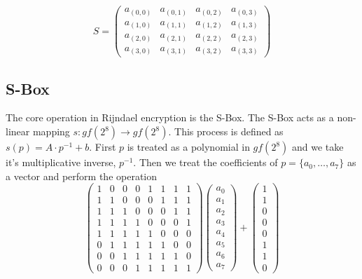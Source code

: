 \documentclass{article}
\begin{document}
\[ S = \left( \begin{array}{cccc}
a_{(0,0)} & a_{(0,1)} & a_{(0,2)} & a_{(0,3)} \\
a_{(1,0)} & a_{(1,1)} & a_{(1,2)} & a_{(1,3)} \\
a_{(2,0)} & a_{(2,1)} & a_{(2,2)} & a_{(2,3)} \\
a_{(3,0)} & a_{(3,1)} & a_{(3,2)} & a_{(3,3)} \end{array} \right)\]

\subsection{S-Box}

The core operation in Rijndael encryption is the S-Box.  The S-Box acts as a non-linear mapping $s:gf(2^8)\rightarrow gf(2^8)$. This process is defined as $s(p) = A \cdot p^{-1} + b$.  First $p$ is treated as a polynomial in $gf(2^8)$ and we take it's multiplicative inverse, $p^{-1}$.  Then we treat the coefficients of $p=\{a_0,\ldots,a_7\}$ as a vector and perform the operation
\[\left( \begin{array}{cccccccc}
1 & 0 & 0 & 0 & 1 & 1 & 1 & 1 \\
1 & 1 & 0 & 0 & 0 & 1 & 1 & 1 \\
1 & 1 & 1 & 0 & 0 & 0 & 1 & 1 \\
1 & 1 & 1 & 1 & 0 & 0 & 0 & 1 \\
1 & 1 & 1 & 1 & 1 & 0 & 0 & 0 \\
0 & 1 & 1 & 1 & 1 & 1 & 0 & 0 \\
0 & 0 & 1 & 1 & 1 & 1 & 1 & 0 \\
0 & 0 & 0 & 1 & 1 & 1 & 1 & 1 \end{array} \right)
\left( \begin{array}{c}
a_0\\ a_1\\ a_2\\ a_3\\ a_4\\ a_5\\ a_6\\ a_7 \end{array} \right) +
\left( \begin{array}{c}
1\\ 1\\ 0\\ 0\\ 0\\ 1\\ 1\\ 0 \end{array} \right)\]
\end{document}
